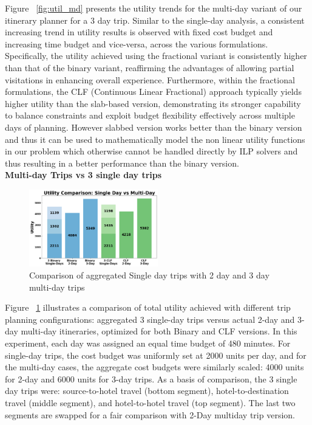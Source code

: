 Figure ~\ref{fig:util_md} presents the utility trends for the multi-day variant of our itinerary planner for a 3 day trip. Similar to the single-day analysis, a consistent increasing trend in utility results is observed with fixed cost budget and increasing time budget and vice-versa, across the various formulations. Specifically, the utility achieved using the fractional variant is consistently higher than that of the binary variant, reaffirming the advantages of allowing partial visitations in enhancing overall experience. Furthermore, within the fractional formulations, the CLF (Continuous Linear Fractional) approach typically yields higher utility than the slab-based version, demonstrating its stronger capability to balance constraints and exploit budget flexibility effectively across multiple days of planning. However slabbed version works better than the binary version and thus it can be used to mathematically model the non linear utility functions in our problem which otherwise cannot be handled directly by ILP solvers and thus resulting in a better performance than the binary version.\\

\noindent\textbf{Multi-day Trips vs 3 single day trips}
\begin{figure}[th]
\centering
\includegraphics[width=0.5\textwidth]{plots/multivssingle.png}
\caption{Comparison of aggregated Single day trips with 2 day and 3 day multi-day trips}
\label{fig:singlevsmultiday}
\end{figure}
Figure ~\ref{fig:singlevsmultiday}  illustrates a comparison of total utility achieved with different trip planning configurations: aggregated 3 single-day trips versus actual 2-day and 3-day multi-day itineraries, optimized for both Binary and CLF versions. In this experiment, each day was assigned an equal time budget of 480 minutes. For single-day trips, the cost budget was uniformly set at 2000 units per day, and for the multi-day cases, the aggregate cost budgets were similarly scaled: 4000 units for 2-day and 6000 units for 3-day trips. As a basis of comparison, the 3 single day trips were: source-to-hotel travel (bottom segment), hotel-to-destination travel (middle segment), and hotel-to-hotel travel (top segment). The last two segments are swapped for a fair comparison with 2-Day multiday trip version.\\

